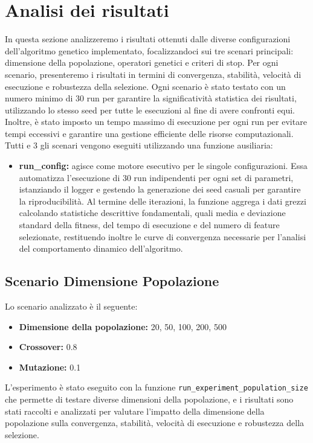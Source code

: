 \documentclass[11pt,a4paper]{article}
\begin{document}
\section{Analisi dei risultati}
In questa sezione analizzeremo i risultati ottenuti dalle diverse configurazioni dell'algoritmo genetico implementato, focalizzandoci sui tre scenari principali: dimensione della popolazione, operatori genetici e criteri di stop. Per ogni scenario, presenteremo i risultati in termini di convergenza, stabilità, velocità di esecuzione e robustezza della selezione.
Ogni scenario è stato testato con un numero minimo di 30 run per garantire la significatività statistica dei risultati, utilizzando lo stesso seed per tutte le esecuzioni al fine di avere confronti equi. Inoltre, è stato imposto un tempo massimo di esecuzione per ogni run per evitare tempi eccessivi e garantire una gestione efficiente delle risorse computazionali.
Tutti e 3 gli scenari vengono eseguiti utilizzando una funzione ausiliaria: 
\begin{itemize}
  \item \textbf{run\_config:} agisce come motore esecutivo per le singole configurazioni. Essa automatizza l'esecuzione di 30 run indipendenti per ogni set di parametri, istanziando il logger e gestendo la generazione dei seed casuali per garantire la riproducibilità. Al termine delle iterazioni, la funzione aggrega i dati grezzi calcolando statistiche descrittive fondamentali, quali media e deviazione standard della fitness, del tempo di esecuzione e del numero di feature selezionate, restituendo inoltre le curve di convergenza necessarie per l'analisi del comportamento dinamico dell'algoritmo.
\end{itemize}
\subsection{Scenario Dimensione Popolazione}
  Lo scenario analizzato è il seguente:
\begin{itemize}
  \item \textbf{Dimensione della popolazione:} 20, 50, 100, 200, 500
  \item \textbf{Crossover:} 0.8
  \item \textbf{Mutazione:} 0.1
\end{itemize}
L'esperimento è stato eseguito con la funzione \texttt{run\_experiment\_population\_size} che permette di testare diverse dimensioni della popolazione, e i risultati sono stati raccolti e analizzati per valutare l'impatto della dimensione della popolazione sulla convergenza, stabilità, velocità di esecuzione e robustezza della selezione.
\end{document}
